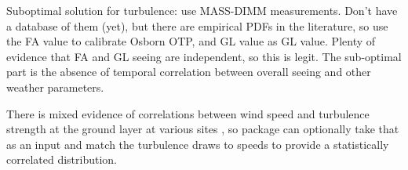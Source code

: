 \documentclass[twocolumn]{aastex631}
\begin{document}
Suboptimal solution for turbulence: use MASS-DIMM measurements. 
Don't have a database of them (yet), but there are empirical PDFs in the literature, so use the FA value to calibrate Osborn OTP, and GL value as GL value. 
Plenty of evidence that FA and GL seeing are independent, so this is legit.
The sub-optimal part is the absence of temporal correlation between overall seeing and other weather parameters.



There is mixed evidence of correlations between wind speed and turbulence strength at the ground layer at various sites , so package can optionally take that as an input and match the turbulence draws to speeds to provide a statistically correlated distribution.
\end{document}
